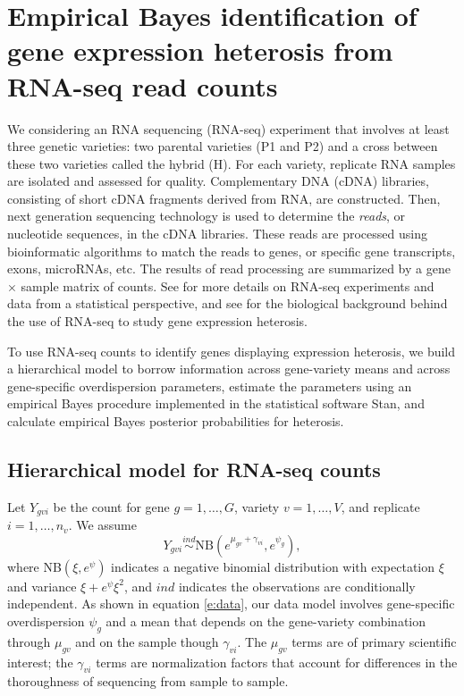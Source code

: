 \documentclass[useAMS,usenatbib,referee]{biom}
\newcommand{\Stan}{Stan}
\newcommand{\RNAseq}{RNA-seq}
\begin{document}
\section{Empirical Bayes identification of gene expression heterosis from \RNAseq{} read counts}
\label{s:method}

We considering an RNA sequencing (\RNAseq{}) experiment that involves at least three genetic varieties: two parental varieties (P1 and P2) and a cross between these two varieties called the hybrid (H). For each variety, replicate RNA samples are isolated and assessed for quality. Complementary DNA (cDNA) libraries, consisting of short cDNA fragments derived from RNA, are constructed. Then, next generation sequencing technology is used to determine the \emph{reads}, or nucleotide sequences, in the cDNA libraries. These reads are processed using bioinformatic algorithms to match the reads to genes, or specific gene transcripts, exons, microRNAs, etc. The results of read processing are summarized by a gene $\times$ sample matrix of counts. See \cite{datta2014statistical} for more details on \RNAseq{} experiments and data from a statistical perspective, and see \cite{paschold2012complementation} for the biological background behind the use of \RNAseq{} to study gene expression heterosis.

To use \RNAseq{} counts to identify genes displaying expression heterosis, we build a hierarchical model to borrow information across gene-variety means and across gene-specific overdispersion parameters, estimate the parameters using an empirical Bayes procedure implemented in the statistical software \Stan{}, and calculate empirical Bayes posterior probabilities for heterosis. 


\subsection{Hierarchical model for \RNAseq{} counts}
\label{s:model}

Let $Y_{gvi}$ be the count for gene $g=1,\ldots,G$, variety $v=1,\ldots,V$, and replicate $i=1,\ldots,n_v$.  We assume
\begin{equation} 
Y_{gvi} \stackrel{ind}{\sim} \mbox{NB}\left(e^{\mu_{gv}+\gamma_{vi}},e^{\psi_g}\right), 
\label{e:data}
\end{equation}
where NB$(\xi,e^\psi)$ indicates a negative binomial distribution with expectation $\xi$ and variance $\xi+e^\psi\xi^2$, and $ind$ indicates the observations are conditionally independent.  As shown in equation \eqref{e:data}, our data model involves gene-specific overdispersion $\psi_g$ and a mean that depends on the gene-variety combination through $\mu_{gv}$ and on the sample though  $\gamma_{vi}$.  The $\mu_{gv}$ terms are of primary scientific interest; the $\gamma_{vi}$ terms are normalization factors that account for differences in the thoroughness of sequencing from sample to sample. 
\end{document}
